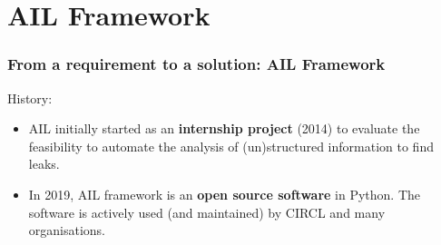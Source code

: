\documentclass{beamer}
\begin{document}
\section{AIL Framework}
\begin{frame}
    \frametitle{From a requirement to a solution: AIL Framework}
    \large{History:}
    \begin{itemize}
        \item AIL initially started as an \textbf{internship project} (2014) to evaluate the feasibility to automate the analysis of (un)structured information to find leaks.
        \item In 2019, AIL framework is an \textbf{open source software} in Python. The software is actively used (and maintained) by CIRCL and many organisations.
    \end{itemize}
\end{frame}
\end{document}
